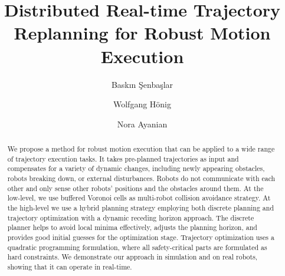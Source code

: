 \documentclass{svproc}
\begin{document}
\mainmatter              %
%
% 
\title{Distributed Real-time Trajectory Replanning for Robust Motion Execution}%


%
%
\author{Baskın Şenbaşlar \and Wolfgang H\"onig \and
Nora Ayanian}
%
%
%

\maketitle              %

\begin{abstract}
We propose a method for robust motion execution that can be applied to a wide range  of  trajectory execution tasks. 
It takes pre-planned trajectories as input and compensates for a variety of dynamic changes, including newly appearing obstacles, robots breaking down, or external disturbances.
Robots do not communicate with each other and only sense other robots' positions and the obstacles around them.
At the low-level, we use buffered Voronoi cells as multi-robot collision avoidance strategy.
At the high-level we use a hybrid planning strategy employing both discrete planning and trajectory optimization with a dynamic receding horizon approach.
The discrete planner helps to avoid local minima effectively, adjusts the planning horizon, and provides good initial guesses for the optimization stage.
Trajectory optimization uses a quadratic programming formulation, where all safety-critical parts are formulated as hard constraints.
We demonstrate our approach in simulation and on real robots, showing that it can operate in real-time.
\end{abstract}
\end{document}
